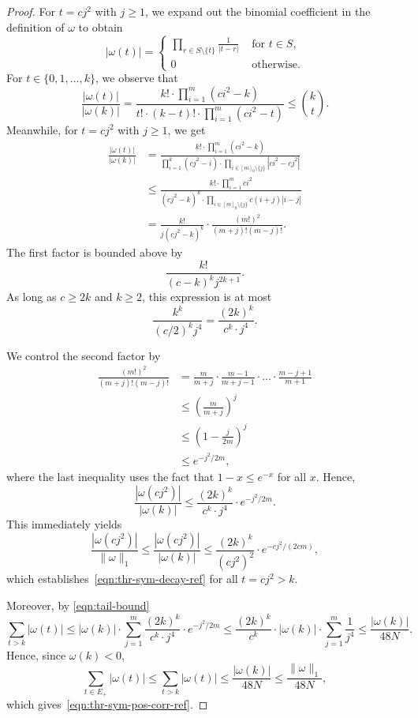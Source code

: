 \documentclass[11pt, letterpaper, fleqn]{article}
\theoremstyle{plain}
\begin{document}
\begin{proof}
 For $t = cj^2$ with $j \ge 1$, we expand out the binomial coefficient in the definition of $\omega$ to obtain
\[|\omega(t)| = \begin{cases}
 \prod\limits_{r \in S\setminus \{t\}} \frac{1}{|t - r|} & \text{ for } t \in S, \\
0 & \text{ otherwise.}
\end{cases}\]
For $t \in \{0, 1, \dots, k\}$, we observe that
\begin{equation} \label{eqn:head-bound}
\frac{|\omega(t)|}{|\omega(k)|} = \frac{k! \cdot \prod_{i = 1}^m (c i^2 - k)}{t! \cdot (k - t)! \cdot \prod_{i = 1}^m (c i^2 - t)} \le \binom{k}{t}.
\end{equation}
Meanwhile, for $t = cj^2$ with $j \ge 1$, we get
\begin{align*}
\frac{|\omega(t)|}{|\omega(k)|} &= \frac{k! \cdot \prod_{i = 1}^m (ci^2 - k)}{\prod_{i = 1}^k(cj^2 - i) \cdot \prod_{i \in [m]_0 \setminus \{j\}} |ci^2 - cj^2|} \\
&\le \frac{k! \cdot \prod_{i = 1}^m ci^2}{(cj^2 - k)^{k} \cdot \prod_{i \in [m]_0 \setminus \{j\}} c(i+j)|i-j|} \\
&= \frac{k!}{j(cj^2 - k)^{k}} \cdot \frac{(m!)^2}{(m+j)!(m-j)!}.
\end{align*}
The first factor is bounded above by
\[\frac{k!}{(c - k)^k j^{2k+1}}.\] 
As long as $c \ge 2k$ and $k \ge 2$,
this expression is at most
\[\frac{k^k}{(c/2)^kj^4} = \frac{(2k)^k}{c^k \cdot j^4}.\]

We control the second factor by
\begin{align*}
\frac{(m!)^2}{(m+j)!(m-j)!} &= \frac{m}{m+j} \cdot \frac{m-1}{m+j-1} \cdot \ldots \cdot \frac{m-j+1}{m+1} \\
&\le \left(\frac{m}{m+j} \right)^j \\
&\le  \left(1 - \frac{j}{2m} \right)^j \\
&\le e^{-j^2/2m},
\end{align*}
where the last inequality uses the fact that $1 - x \le e^{-x}$ for all $x$. Hence,
\begin{equation} \label{eqn:tail-bound}
\frac{|\omega(cj^2)|}{|\omega(k)|} \le \frac{(2k)^k}{c^k \cdot j^4} \cdot e^{-j^2/2m}.
\end{equation}
This immediately yields
\[\frac{|\omega(cj^2)|}{\|\omega\|_1} \le \frac{|\omega(cj^2)|}{|\omega(k)|} \le \frac{(2k)^k}{(cj^2)^2} \cdot e^{-cj^2/(2cm)},\]
 which establishes~\eqref{eqn:thr-sym-decay-ref} for all $t = cj^2 > k$. 
 
 Moreover, by \eqref{eqn:tail-bound}
\begin{equation} \label{eqn:tail-sum}
\sum_{t > k} |\omega(t)| \le |\omega(k)| \cdot \sum_{j = 1}^m \frac{(2k)^k}{c^k \cdot j^4} \cdot e^{-j^2/2m} \le \frac{(2k)^k}{c^k} \cdot |\omega(k)| \cdot  \sum_{j=1}^m \frac{1}{j^4} \le \frac{|\omega(k)|}{48 N}.
\end{equation}
Hence, since $\omega(k) < 0$,
\[\sum_{t \in E_+} |\omega(t)| \le \sum_{t > k} |\omega(t)| \le \frac{|\omega(k)|}{48 N} \le \frac{\|\omega\|_1}{48N},\]
which gives~\eqref{eqn:thr-sym-pos-corr-ref}.


\end{proof}
\end{document}
